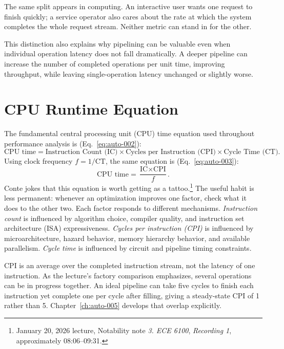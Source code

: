The same split appears in computing.
An interactive user wants one request to finish quickly; a service operator also cares about the rate at which the system completes the whole request stream.
Neither metric can stand in for the other.

This distinction also explains why pipelining can be valuable even when individual operation latency does not fall dramatically.
A deeper pipeline can increase the number of completed operations per unit time, improving throughput, while leaving single-operation latency unchanged or slightly worse.


\section{CPU Runtime Equation}\label{sec:auto-012}
The fundamental central processing unit (CPU) time equation used throughout performance analysis is (Eq.~\eqref{eq:auto-002}):
\begin{equation}\label{eq:auto-002}
    \text{CPU time} = \text{Instruction Count (IC)} \times \text{Cycles per Instruction (CPI)} \times \text{Cycle Time (CT)}.
\end{equation}
Using clock frequency $f = 1/\text{CT}$, the same equation is (Eq.~\eqref{eq:auto-003}):
\begin{equation}\label{eq:auto-003}
    \text{CPU time} = \frac{\text{IC} \times \text{CPI}}{f}.
\end{equation}
Conte jokes that this equation is worth getting as a tattoo.\footnote{January 20, 2026 lecture, Notability note \emph{3. ECE 6100}, \emph{Recording 1}, approximately 08:06--09:31.}
The useful habit is less permanent: whenever an optimization improves one factor, check what it does to the other two.
Each factor responds to different mechanisms.
\textit{Instruction count} is influenced by algorithm choice, compiler quality, and instruction set architecture (ISA) expressiveness.
\textit{Cycles per instruction (CPI)} is influenced by microarchitecture, hazard behavior, memory hierarchy behavior, and available parallelism.
\textit{Cycle time} is influenced by circuit and pipeline timing constraints.

CPI is an average over the completed instruction stream, not the latency of one instruction.
As the lecture's factory comparison emphasizes, several operations can be in progress together.
An ideal pipeline can take five cycles to finish each instruction yet complete one per cycle after filling, giving a steady-state CPI of 1 rather than 5.
Chapter~\ref{ch:auto-005} develops that overlap explicitly.

